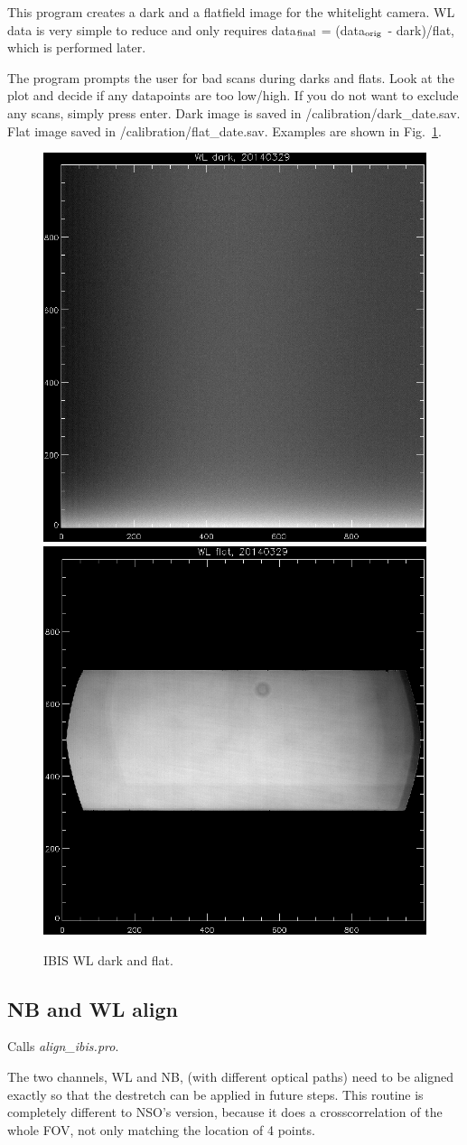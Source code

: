 \documentclass[a4paper,12pt]{article}
\begin{document}
This program creates a dark and a flatfield image for the whitelight camera. WL data is very simple to reduce and only requires data$_{\rm final}$ = (data$_{\rm orig}$ - dark)/flat, which is performed later.

The program prompts the user for bad scans during darks and flats. Look at the
plot and decide if any datapoints are too low/high. If you do not want
to exclude any scans, simply press enter. Dark image is saved in /calibration/dark\_date.sav.
Flat image saved in /calibration/flat\_date.sav. Examples are shown in Fig.~\ref{figwl}.

\begin{figure}[!htb]
\begin{centering}
\includegraphics[width=.45\textwidth]{ibiswldark.png}
\includegraphics[width=.45\textwidth]{ibiswlflat.png}
\caption{IBIS WL dark and flat.\label{figwl}}
\end{centering}
\end{figure}


\subsection{NB and WL align}
Calls \textit{align\_ibis.pro}.


The two channels, WL and NB, (with different optical paths) need to be aligned exactly so that the destretch can be applied in future steps. This routine is completely different to NSO's version, because it does a crosscorrelation of the whole FOV, not only matching the location of 4 points.
\end{document}
